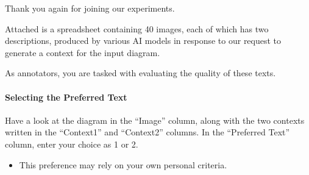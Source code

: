 \centering
\begin{tcolorbox}[
    colback=white,
    colframe=gray!20,
    arc=10pt,
    boxrule=1pt,
    title={\textcolor{white}{\textbf{Evaluation Guidelines for the \textcolor{lime}{Sighted Educator} Group (1/2)}}},
    coltitle=white,
    fonttitle=\large,
    colbacktitle=black!70,
]

Thank you again for joining our experiments.

Attached is a spreadsheet containing 40 images, each of which has two descriptions, produced by various AI models in response to our request to generate a context for the input diagram.

As annotators, you are tasked with evaluating the quality of these texts.

\paragraph{Selecting the Preferred Text}

Have a look at the diagram in the ``Image'' column, along with the two contexts written in the ``Context1'' and ``Context2'' columns. In the ``Preferred Text'' column, enter your choice as 1 or 2.
\begin{itemize}
    \item This preference may rely on your own personal criteria.
\end{itemize}

\end{tcolorbox}





